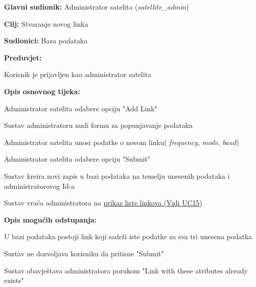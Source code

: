 			\noindent {}
		\begin{packed_item}
			
			\item \textbf{Glavni sudionik: }Administrator satelita (\textit{satellite\_admin})
			\item  \textbf{Cilj: }Stvaranje novog linka
			\item  \textbf{Sudionici: }Baza podataka
			\item  \textbf{Preduvjet: }
			\begin{packed_enum}
				\item Korisnik je prijavljen kao administrator satelita	\end{packed_enum}
			\item  \textbf{Opis osnovnog tijeka: }
			
			\item[] \begin{packed_enum}
				\item Administrator satelita odabere opciju "Add Link"
				\item Sustav administratoru nudi formu za popunjavanje podataka
				\item Administrator satelita unosi podatke o novom linku( \textit{frequency}, \textit{mode}, \textit{baud})
				\item Administrator satelita odabere opciju "Submit"
				\item Sustav kreira novi zapis u bazi podataka na temelju unesenih podataka i administratorovog Id-a
				\item Sustav vraća administratora na \hyperref[UC15]{prikaz liste linkova (Vidi UC15)} 
				
			\end{packed_enum}
			
			\item  \textbf{Opis mogućih odstupanja: }
			
			\item[] \begin{packed_enum}
				
				\item[1] U bazi podataka postoji link koji sadrži iste podatke za sva tri unesena podatka
				\item[ ] \begin{packed_enum}
					
					\item[1.1] Sustav ne dozvoljava korisniku da pritisne "Submit"
					\item[1.2] Sustav obavještava administratora porukom "Link with these atributes already exists"
				\end{packed_enum}
			\end{packed_enum}
		\end{packed_item}
